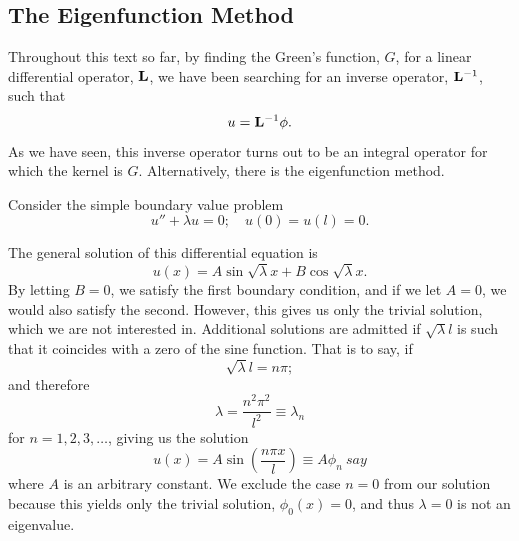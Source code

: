 \subsection{The Eigenfunction Method}
Throughout this text so far, by finding the Green's function, \(G\), for a linear differential operator, \(\mathrm{\bf{L}}\), we have been searching for an inverse operator, \(\mathrm{\bf{L}}^{-1}\), such that
\begin{equation*}
    u = \mathrm{\bf{L}}^{-1} \phi.
\end{equation*}
As we have seen, this inverse operator turns out to be an integral operator for which the kernel is \(G\). Alternatively, there is the eigenfunction method.

Consider the simple boundary value problem
\begin{equation*}
    u'' + \lambda u = 0;\quad u(0) = u(l) = 0.
\end{equation*}

The general solution of this differential equation is
\begin{equation}
    u(x) = A\sin\sqrt{\lambda}x+ B\cos\sqrt{\lambda}x.
\end{equation}
By letting \(B=0\), we satisfy the first boundary condition, and if we let \(A=0\), we would also satisfy the second. However, this gives us only the trivial solution, which we are not interested in. Additional solutions are admitted if \(\sqrt{\lambda}l\) is such that it coincides with a zero of the sine function. That is to say, if
\begin{equation*}
    \sqrt{\lambda}l = n\pi; 
\end{equation*}
and therefore
\begin{equation*}
    \lambda = \frac{n^2\pi^2}{l^2} \equiv \lambda_n
\end{equation*}
for \(n= 1,2,3, \dots\), giving us the solution
\begin{equation*}
    u(x) = A\sin (\frac{n\pi x}{l}) \equiv A\phi_n\ say
\end{equation*}
where \(A\) is an arbitrary constant. We exclude the case \(n=0\) from our solution because this yields only the trivial solution, \(\phi_0(x)=0\), and thus \(\lambda = 0\) is not an eigenvalue.
